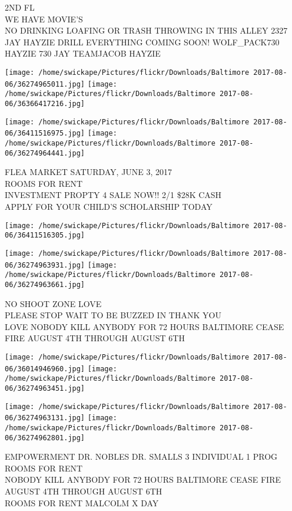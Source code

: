 \documentclass[10pt,letterpaper]{article}
\begin{document}
2ND FL\\
WE HAVE MOVIE'S\\
NO DRINKING LOAFING OR TRASH THROWING IN THIS ALLEY 2327\\
JAY HAYZIE DRILL EVERYTHING COMING SOON! WOLF\_PACK730 HAYZIE 730 JAY TEAMJACOB HAYZIE
\pagebreak

\texttt{[image: /home/swickape/Pictures/flickr/Downloads/Baltimore 2017-08-06/36274965011.jpg]}
\texttt{[image: /home/swickape/Pictures/flickr/Downloads/Baltimore 2017-08-06/36366417216.jpg]}

\texttt{[image: /home/swickape/Pictures/flickr/Downloads/Baltimore 2017-08-06/36411516975.jpg]}
\texttt{[image: /home/swickape/Pictures/flickr/Downloads/Baltimore 2017-08-06/36274964441.jpg]}

FLEA MARKET SATURDAY, JUNE 3, 2017\\
ROOMS FOR RENT\\
INVESTMENT PROPTY 4 SALE NOW!! 2/1 \$28K CASH\\
APPLY FOR YOUR CHILD'S SCHOLARSHIP TODAY
\pagebreak

\texttt{[image: /home/swickape/Pictures/flickr/Downloads/Baltimore 2017-08-06/36411516305.jpg]}

\vspace{0.25in}
\texttt{[image: /home/swickape/Pictures/flickr/Downloads/Baltimore 2017-08-06/36274963931.jpg]}
\texttt{[image: /home/swickape/Pictures/flickr/Downloads/Baltimore 2017-08-06/36274963661.jpg]}

NO SHOOT ZONE LOVE\\
PLEASE STOP WAIT TO BE BUZZED IN THANK YOU\\
LOVE NOBODY KILL ANYBODY FOR 72 HOURS BALTIMORE CEASE FIRE AUGUST 4TH THROUGH AUGUST 6TH
\pagebreak

\texttt{[image: /home/swickape/Pictures/flickr/Downloads/Baltimore 2017-08-06/36014946960.jpg]}
\texttt{[image: /home/swickape/Pictures/flickr/Downloads/Baltimore 2017-08-06/36274963451.jpg]}

\texttt{[image: /home/swickape/Pictures/flickr/Downloads/Baltimore 2017-08-06/36274963131.jpg]}
\texttt{[image: /home/swickape/Pictures/flickr/Downloads/Baltimore 2017-08-06/36274962801.jpg]}

EMPOWERMENT DR. NOBLES DR. SMALLS 3 INDIVIDUAL 1 PROG\\
ROOMS FOR RENT\\
NOBODY KILL ANYBODY FOR 72 HOURS BALTIMORE CEASE FIRE AUGUST 4TH THROUGH AUGUST 6TH\\
ROOMS FOR RENT MALCOLM X DAY
\pagebreak
\end{document}
